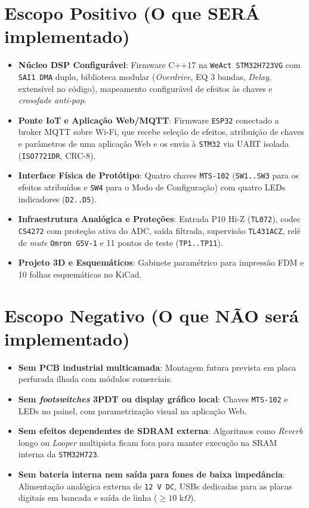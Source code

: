\documentclass[12pt,openright,oneside,a4paper,brazil]{abntex2}
\begin{document}
\section{Escopo Positivo (O que SERÁ implementado)}
\begin{itemize}
  \item \textbf{Núcleo DSP Configurável}: Firmware C++17 na \texttt{WeAct STM32H723VG} com \texttt{SAI1 DMA} duplo, biblioteca modular (\textit{Overdrive}, EQ 3 bandas, \textit{Delay}, extensível no código), mapeamento configurável de efeitos às chaves e \textit{crossfade anti-pop}.
  \item \textbf{Ponte IoT e Aplicação Web/MQTT}: Firmware \texttt{ESP32} conectado a broker MQTT sobre Wi-Fi, que recebe seleção de efeitos, atribuição de chaves e parâmetros de uma aplicação Web e os envia à \texttt{STM32} via UART isolada (\texttt{ISO7721DR}, CRC-8).
  \item \textbf{Interface Física de Protótipo}: Quatro chaves \texttt{MTS-102} (\texttt{SW1..SW3} para os efeitos atribuídos e \texttt{SW4} para o Modo de Configuração) com quatro LEDs indicadores (\texttt{D2..D5}).
  \item \textbf{Infraestrutura Analógica e Proteções}: Entrada P10 Hi-Z (\texttt{TL072}), codec \texttt{CS4272} com proteção ativa do ADC, saída filtrada, supervisão \texttt{TL431ACZ}, relé de \textit{mute} \texttt{Omron G5V-1} e 11 pontos de teste (\texttt{TP1..TP11}).
  \item \textbf{Projeto 3D e Esquemáticos}: Gabinete paramétrico para impressão FDM e 10 folhas esquemáticas no KiCad.
\end{itemize}

\section{Escopo Negativo (O que NÃO será implementado)}
\begin{itemize}
  \item \textbf{Sem PCB industrial multicamada}: Montagem futura prevista em placa perfurada ilhada com módulos comerciais.
  \item \textbf{Sem \textit{footswitches} 3PDT ou display gráfico local}: Chaves \texttt{MTS-102} e LEDs no painel, com parametrização visual na aplicação Web.
  \item \textbf{Sem efeitos dependentes de SDRAM externa}: Algoritmos como \textit{Reverb} longo ou \textit{Looper} multipista ficam fora para manter execução na SRAM interna da \texttt{STM32H723}.
  \item \textbf{Sem bateria interna nem saída para fones de baixa impedância}: Alimentação analógica externa de \texttt{12 V DC}, USBs dedicadas para as placas digitais em bancada e saída de linha ($\ge 10\text{ k}\Omega$).
\end{itemize}
\end{document}
